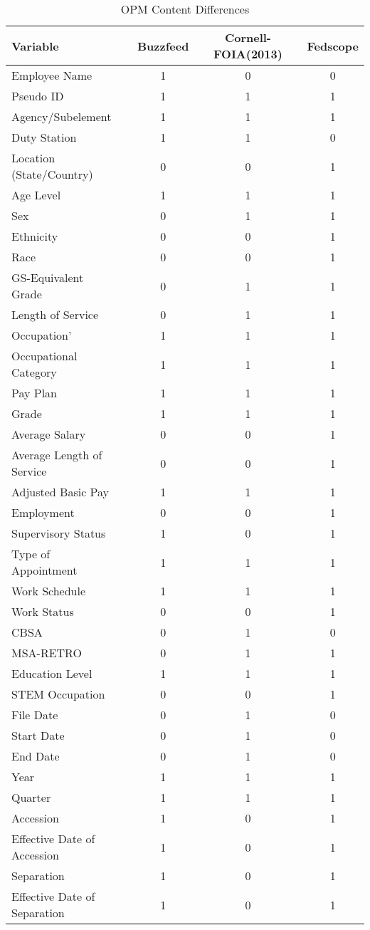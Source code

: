 \documentclass{article}
\author[1,2]{Lars Vilhuber}
\affil[1]{Cornell University}
\affil[2]{U.S. Census Bureau}
\begin{document}

\begin{table}[htbp]
	\centering
	\caption{OPM Content Differences}
	\begin{tabular}{l|rccccc}
		Variable 	&& Buzzfeed && Cornell-FOIA(2013) && Fedscope \\ \hline\hline
		Employee Name&&1&&0&&0\\
		Pseudo ID&&1&&1&&1\\
		Agency/Subelement&&1&&1&&1\\
		Duty Station&&1&&1&&0\\
		Location (State/Country)&&0&&0&&1\\
		Age Level&&1&&1&&1\\
		Sex &&0&&1&&1\\
		Ethnicity&&0&&0&&1\\
		Race&&0&&0&&1\\
		GS-Equivalent Grade&&0&&1&&1\\
		Length of Service&&0&&1&&1\\
		Occupation'&&1&&1&&1\\
		Occupational Category&&1&&1&&1\\
		Pay Plan &&1&&1&&1\\
		Grade&&1&&1&&1\\
		Average Salary&&0&&0&&1\\
		Average Length of Service&&0&&0&&1\\
		Adjusted Basic Pay&&1&&1&&1\\
		Employment&&0&&0&&1\\
		Supervisory Status&&1&&0&&1\\
		Type of Appointment&&1&&1&&1\\
		Work Schedule&&1&&1&&1\\
		Work Status&&0&&0&&1\\
		CBSA&&0&&1&&0\\
		MSA-RETRO&&0&&1&&1\\
		Education Level&&1&&1&&1\\
		STEM Occupation&&0&&0&&1\\
		File Date&&0&&1&&0\\
		Start Date&&0&&1&&0\\
		End Date&&0&&1&&0\\
		Year&&1&&1&&1\\
		Quarter&&1&&1&&1\\
		Accession&&1&&0&&1\\
		Effective Date of Accession&&1&&0&&1\\
		Separation&&1&&0&&1\\
		Effective Date of Separation&&1&&0&&1\\
	\end{tabular}
\end{table}
\end{document}
